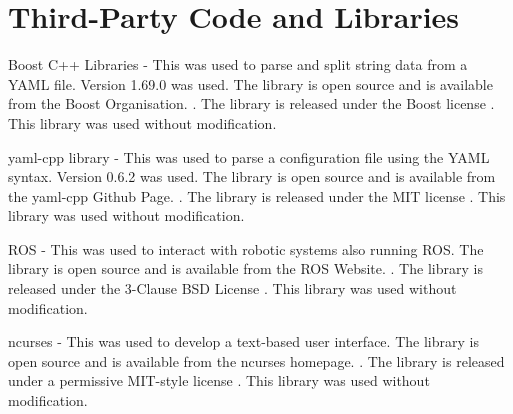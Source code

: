 \chapter{Third-Party Code and Libraries}







Boost C++ Libraries - This was used to parse and split string data from a YAML file. Version 1.69.0 was used. The library is open source and is available from the Boost Organisation.
\cite{boost}. The library is released under the Boost license
\cite{boost-license}. This library was used without modification.

yaml-cpp library - This was used to parse a configuration file using the YAML syntax. Version 0.6.2 was used. The library is open source and is available from the yaml-cpp Github Page.
\cite{yaml-cpp}. The library is released under the MIT license
\cite{yaml-cpp-license}. This library was used without modification.

ROS - This was used to interact with robotic systems also running ROS. The library is open source and is available from the ROS Website.
\cite{ros}. The library is released under the 3-Clause BSD License
\cite{bsd-license-3}. This library was used without modification.

ncurses - This was used to develop a text-based user interface. The library is open source and is available from the ncurses homepage.
\cite{ncurses}. The library is released under a permissive MIT-style license
\cite{ncurses-license}. This library was used without modification.

